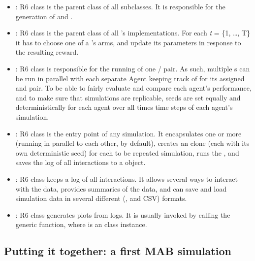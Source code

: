 \documentclass{jss}
\begin{document}
\begin{itemize}
         \item {}: R6 class  is the parent class of all   subclasses. It is responsible for the generation of  and .

         \item {}: R6 class  is the parent class of all 's  implementations. For each \emph{t} = \{1, \ldots, T\} it has to choose one of a 's  arms, and update its parameters  in response to the resulting reward.

         \item {}: R6 class  is responsible for the running of one / pair. As such, multiple s can be run in parallel with each separate Agent keeping track of  for its assigned  and  pair. To be able to fairly evaluate and compare each agent's performance, and to make sure that simulations are replicable, seeds are set equally and deterministically for each agent over all  times  time steps of each agent's simulation.

         \item {}: R6 class  is the entry point of any  simulation. It encapsulates one or more  (running in parallel to each other, by default), creates an  clone (each with its own deterministic seed) for each to be repeated simulation, runs the , and saves the log of all  interactions to a  object.

         \item {}: R6 class  keeps a log of all  interactions. It allows several ways to interact with the data, provides summaries of the data, and can save and load simulation data in several different (,  and CSV) formats.

         \item {}: R6 class  generates plots from  logs. It is usually invoked by calling the generic  function, where  is an  class instance.
\end{itemize}

\subsection{Putting it together: a first MAB simulation}
\end{document}
